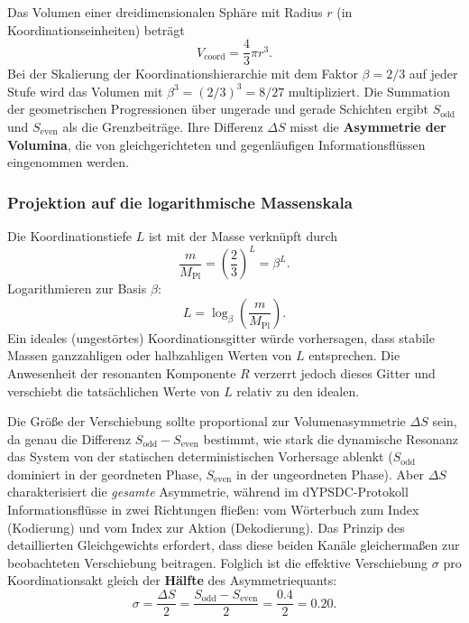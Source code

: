 \documentclass[12pt,a4paper]{article}
\begin{document}
	Das Volumen einer dreidimensionalen Sphäre mit Radius \(r\) (in Koordinationseinheiten) beträgt
	\[
	V_{\text{coord}} = \frac{4}{3}\pi r^3.
	\]
	Bei der Skalierung der Koordinationshierarchie mit dem Faktor \(\beta = 2/3\) auf jeder Stufe wird das Volumen mit \(\beta^3 = (2/3)^3 = 8/27\) multipliziert. Die Summation der geometrischen Progressionen über ungerade und gerade Schichten ergibt \(S_{\mathrm{odd}}\) und \(S_{\mathrm{even}}\) als die Grenzbeiträge. Ihre Differenz \(\Delta S\) misst die \textbf{Asymmetrie der Volumina}, die von gleichgerichteten und gegenläufigen Informationsflüssen eingenommen werden.
	
	\subsubsection{Projektion auf die logarithmische Massenskala}
	
	Die Koordinationstiefe \(L\) ist mit der Masse verknüpft durch
	\[
	\frac{m}{M_{\mathrm{Pl}}} = \left(\frac{2}{3}\right)^L = \beta^L.
	\]
	Logarithmieren zur Basis \(\beta\):
	\[
	L = \log_{\beta}\left(\frac{m}{M_{\mathrm{Pl}}}\right).
	\]
	Ein ideales (ungestörtes) Koordinationsgitter würde vorhersagen, dass stabile Massen ganzzahligen oder halbzahligen Werten von \(L\) entsprechen. Die Anwesenheit der resonanten Komponente \(R\) verzerrt jedoch dieses Gitter und verschiebt die tatsächlichen Werte von \(L\) relativ zu den idealen.
	
	Die Größe der Verschiebung sollte proportional zur Volumenasymmetrie \(\Delta S\) sein, da genau die Differenz \(S_{\mathrm{odd}} - S_{\mathrm{even}}\) bestimmt, wie stark die dynamische Resonanz das System von der statischen deterministischen Vorhersage ablenkt (\(S_{\mathrm{odd}}\) dominiert in der geordneten Phase, \(S_{\mathrm{even}}\) in der ungeordneten Phase). Aber \(\Delta S\) charakterisiert die \textit{gesamte} Asymmetrie, während im dYPSDC-Protokoll Informationsflüsse in zwei Richtungen fließen: vom Wörterbuch zum Index (Kodierung) und vom Index zur Aktion (Dekodierung). Das Prinzip des detaillierten Gleichgewichts erfordert, dass diese beiden Kanäle gleichermaßen zur beobachteten Verschiebung beitragen. Folglich ist die effektive Verschiebung \(\sigma\) pro Koordinationsakt gleich der \textbf{Hälfte} des Asymmetriequants:
	\begin{equation}
		\boxed{\sigma = \frac{\Delta S}{2} = \frac{S_{\mathrm{odd}} - S_{\mathrm{even}}}{2} = \frac{0.4}{2} = 0.20.}
		\label{eq:sigma_final}
	\end{equation}
	
\end{document}

